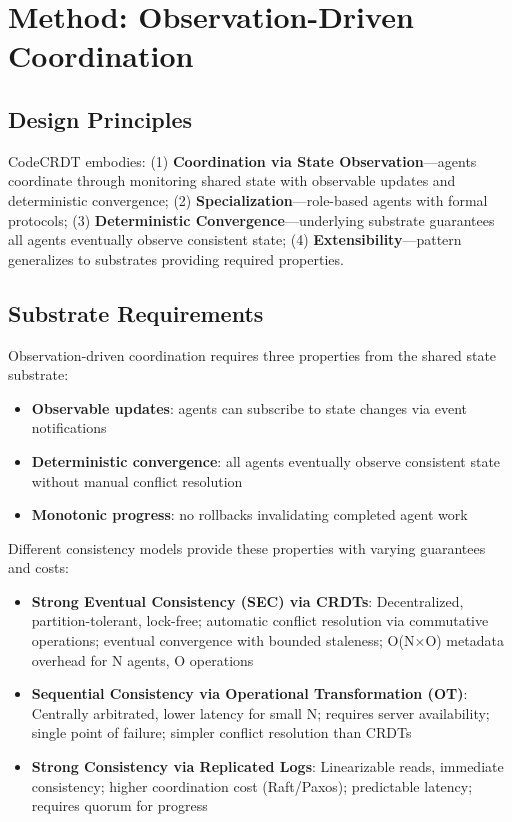 \documentclass{article}
\begin{document}
\section{Method: Observation-Driven Coordination}
\label{sec:method}

\subsection{Design Principles}

CodeCRDT embodies: (1) \textbf{Coordination via State Observation}---agents coordinate through monitoring shared state with observable updates and deterministic convergence; (2) \textbf{Specialization}---role-based agents with formal protocols; (3) \textbf{Deterministic Convergence}---underlying substrate guarantees all agents eventually observe consistent state; (4) \textbf{Extensibility}---pattern generalizes to substrates providing required properties.

\subsection{Substrate Requirements}

Observation-driven coordination requires three properties from the shared state substrate:
\begin{itemize}
\item \textbf{Observable updates}: agents can subscribe to state changes via event notifications
\item \textbf{Deterministic convergence}: all agents eventually observe consistent state without manual conflict resolution
\item \textbf{Monotonic progress}: no rollbacks invalidating completed agent work
\end{itemize}

Different consistency models provide these properties with varying guarantees and costs:

\begin{itemize}
\item \textbf{Strong Eventual Consistency (SEC) via CRDTs}: Decentralized, partition-tolerant, lock-free; automatic conflict resolution via commutative operations; eventual convergence with bounded staleness; O(N$\times$O) metadata overhead for N agents, O operations
\item \textbf{Sequential Consistency via Operational Transformation (OT)}: Centrally arbitrated, lower latency for small N; requires server availability; single point of failure; simpler conflict resolution than CRDTs
\item \textbf{Strong Consistency via Replicated Logs}: Linearizable reads, immediate consistency; higher coordination cost (Raft/Paxos); predictable latency; requires quorum for progress
\end{itemize}
\end{document}
